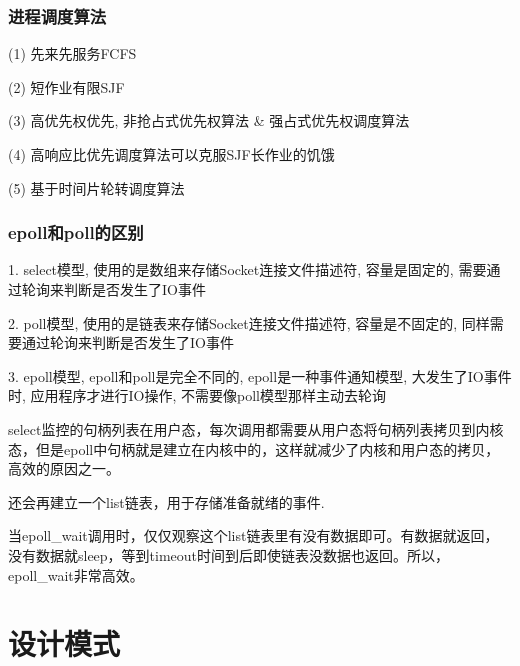\documentclass[UTF8]{ctexart}
\begin{document}
\subsubsection{进程调度算法}
(1) 先来先服务FCFS\par
(2) 短作业有限SJF \par
(3) 高优先权优先, 非抢占式优先权算法 \& 强占式优先权调度算法 \par
(4) 高响应比优先调度算法可以克服SJF长作业的饥饿 \par
(5) 基于时间片轮转调度算法 \par
\subsubsection{epoll和poll的区别}
1. select模型, 使用的是数组来存储Socket连接文件描述符, 容量是固定的, 需要通过轮询来判断是否发生了IO事件\par
2. poll模型, 使用的是链表来存储Socket连接文件描述符, 容量是不固定的, 同样需要通过轮询来判断是否发生了IO事件 \par
3. epoll模型, epoll和poll是完全不同的, epoll是一种事件通知模型, 大发生了IO事件时, 应用程序才进行IO操作, 不需要像poll模型那样主动去轮询 \par

select监控的句柄列表在用户态，每次调用都需要从用户态将句柄列表拷贝到内核态，但是epoll中句柄就是建立在内核中的，这样就减少了内核和用户态的拷贝，高效的原因之一。

还会再建立一个list链表，用于存储准备就绪的事件.

当epoll\_wait调用时，仅仅观察这个list链表里有没有数据即可。有数据就返回，没有数据就sleep，等到timeout时间到后即使链表没数据也返回。所以，epoll\_wait非常高效。
\section{设计模式}
\end{document}
